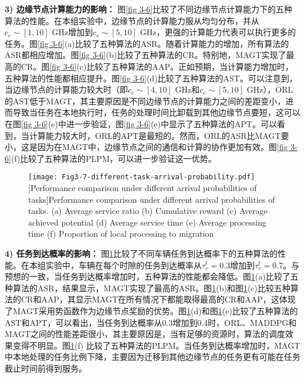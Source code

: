 \textbf{3) 边缘节点计算能力的影响：} 图\ref{fig 3-6}比较了不同边缘节点计算能力下的五种算法的性能。在本组实验中，边缘节点的计算能力服从均匀分布，并从$c_e\sim[1, 10]$ GHz增加到$c_e\sim[5, 10]$ GHz，更强的计算能力代表可以执行更多的任务。图\ref{fig 3-6}(a)比较了五种算法的ASR。随着计算能力的增加，所有算法的ASR都相应增加。图\ref{fig 3-6}(b)比较了五种算法的CR。特别地，MAGT实现了最高的CR。图\ref{fig 3-6}(c)比较了五种算法的AAP。正如预期，当计算能力增加时，五种算法的性能都相应提升。图\ref{fig 3-6}(d)比较了五种算法的AST。可以注意到，当边缘节点的计算能力较大时（即$c_e\sim[4,10]$ GHz和$c_e\sim[5,10]$ GHz），ORL的AST低于MAGT，其主要原因是不同边缘节点的计算能力之间的差距变小，进而导致当任务在本地执行时，任务的处理时间比卸载到其他边缘节点要短，这可以在图\ref{fig 3-6}(e)中进一步验证，图\ref{fig 3-6}(e)中显示了五种算法的APT。可以看到，当计算能力较大时，ORL的APT是最短的。然而，ORL的ASR比MAGT要小，这是因为在MAGT中，边缘节点之间的通信和计算的协作更加有效。图\ref{fig 3-6}(f)比较了五种算法的PLPM，可以进一步验证这一优势。

\begin{figure}[h]
\centering
  \texttt{[image: Fig3-7-different-task-arrival-probability.pdf]}
  [Performance comparison under different arrival probabilities of tasks]{Performance comparison under different arrival probabilities of tasks. (a) Average service ratio (b) Cumulative reward (c) Average achieved potential (d) Average service time (e) Average processing time (f) Proportion of local processing to migration}
  \label{fig 3-7}
\end{figure} 

\textbf{4) 任务到达概率的影响：} 图\ref{fig 3-7}比较了不同车辆任务到达概率下的五种算法的性能。在本组实验中，车辆在每个时隙的任务到达概率从$\tau_{v}^{t}=0.3$增加到$\tau_{v}^{t}=0.7$。与预想的一致，当任务到达概率增加时，五种算法的性能都会降低。图\ref{fig 3-7}(a)比较了五种算法的ASR，结果显示，MAGT实现了最高的ASR。图\ref{fig 3-7}(b)和图\ref{fig 3-7}(c)比较五种算法的CR和AAP，其显示MAGT在所有情况下都能取得最高的CR和AAP，这体现了MAGT采用势函数作为边缘节点奖励的优势。图\ref{fig 3-7}(d)和图\ref{fig 3-7}(e)比较了五种算法的AST和APT，可以看出，当任务到达概率从0.3增加到0.4时，ORL、MADDPG和MAGT之间的性能差距很小，其主要原因是，当有足够的资源时，算法的调度效果变得不明显。图\ref{fig 3-7}(f) 比较了五种算法的PLPM。当任务到达概率增加时，MAGT中本地处理的任务比例下降，主要因为迁移到其他边缘节点的任务更有可能在任务截止时间前得到服务。

